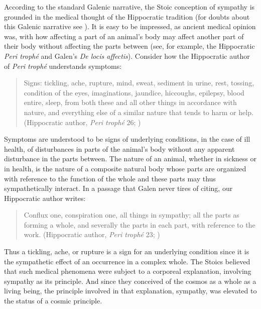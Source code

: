 According to the standard Galenic narrative, the Stoic conception of sympathy is grounded in the medical thought of the Hippocratic tradition (for doubts about this Galenic narrative see \citealt{Holmes:2015aa}). It is easy to be impressed, as ancient medical opinion was, with how affecting a part of an animal's body may affect another part of their body without affecting the parts between (see, for example, the Hippocratic \emph{Peri troph\'{e}} and Galen's \emph{De locis affectis}). Consider how the Hippocratic author of \emph{Peri troph\'{e}} understands symptoms: 
\begin{quote}
	Signs: tickling, ache, rupture, mind, sweat, sediment in urine, rest, tossing, condition of the eyes, imaginations, jaundice, hiccoughs, epilepsy, blood entire, sleep, from both these and all other things in accordance with nature, and everything else of a similar nature that tends to harm or help. (Hippocratic author, \emph{Peri troph\'{e}} 26; \citealt[351]{Jones:1957aa})
\end{quote}
Symptoms are understood to be signs of underlying conditions, in the case of ill health, of disturbances in parts of the animal's body without any apparent disturbance in the parts between. The nature of an animal, whether in sickness or in health, is the nature of a composite natural body whose parts are organized with reference to the function of the whole and these parts may thus sympathetically interact. In a passage that Galen never tires of citing, our Hippocratic author writes:
\begin{quote}
	Conflux one, conspiration one, all things in sympathy; all the parts as forming a whole, and severally the parts in each part, with reference to the work. (Hippocratic author, \emph{Peri troph\'{e}} 23; \citealt[351]{Jones:1957aa})
\end{quote}
Thus a tickling, ache, or rupture is a sign for an underlying condition since it is the sympathetic effect of an occurrence in a complex whole. The Stoics believed that such medical phenomena were subject to a corporeal explanation, involving sympathy as its principle. And since they conceived of the cosmos as a whole as a living being, the principle involved in that explanation, sympathy, was elevated to the status of a cosmic principle.


